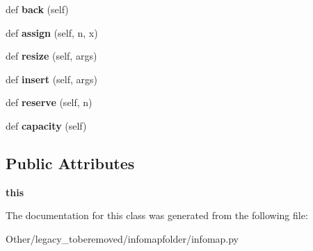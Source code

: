 \begin{DoxyCompactItemize}
def {\bfseries back} (self)
\item 
\mbox{\label{classinfomapfolder_1_1infomap_1_1StringVector_a5456e25c213b284682e1b3c7064c79f7}} 
def {\bfseries assign} (self, n, x)
\item 
\mbox{\label{classinfomapfolder_1_1infomap_1_1StringVector_acfdc39a9dbf88c3f8d3f487fa959f8a0}} 
def {\bfseries resize} (self, args)
\item 
\mbox{\label{classinfomapfolder_1_1infomap_1_1StringVector_a41bcb1a80f00a961866ae624281e9256}} 
def {\bfseries insert} (self, args)
\item 
\mbox{\label{classinfomapfolder_1_1infomap_1_1StringVector_a712e41e0bc282a7b9fba8235ab8a62e9}} 
def {\bfseries reserve} (self, n)
\item 
\mbox{\label{classinfomapfolder_1_1infomap_1_1StringVector_a5cde98dd98d4f69ace4fba6a276ee81c}} 
def {\bfseries capacity} (self)
\end{DoxyCompactItemize}
\subsection*{Public Attributes}
\begin{DoxyCompactItemize}
\item 
\mbox{\label{classinfomapfolder_1_1infomap_1_1StringVector_a266b24b658e64e54d5778e33d2398ec6}} 
{\bfseries this}
\end{DoxyCompactItemize}


The documentation for this class was generated from the following file\+:\begin{DoxyCompactItemize}
\item 
Other/legacy\+\_\+toberemoved/infomapfolder/infomap.\+py\end{DoxyCompactItemize}
